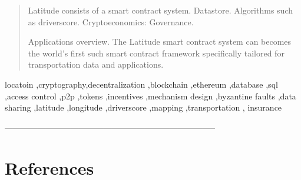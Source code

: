 \documentclass[preprint,10pt]{elsarticle}
\theoremstyle{definition}
\begin{document}
\begin{frontmatter}
\begin{abstract}
   Latitude consists of a smart contract system.
   Datastore.
   Algorithms such as driverscore.
   Cryptoeconomics:
   Governance.

    Applications overview.
The Latitude smart contract system can becomes the world's first such smart contract framework specifically tailored for
transportation data and applications.
\newline
\newline
\newline
\newline
\end{abstract}

\begin{keyword}
	\textsf{locatoin \sep cryptography\sep decentralization \sep blockchain \sep ethereum \sep database \sep sql
    \sep access control \sep p2p \sep tokens \sep incentives \sep mechanism design \sep byzantine
    faults \sep data sharing \sep latitude \sep longitude \sep driverscore \sep mapping \sep transportation \sep
    insurance}
\end{keyword}

\end{frontmatter}

\newpage
\tableofcontents
\newpage









%






%

-----------------------------------------------------------------------------
\section{References}

\end{document}
